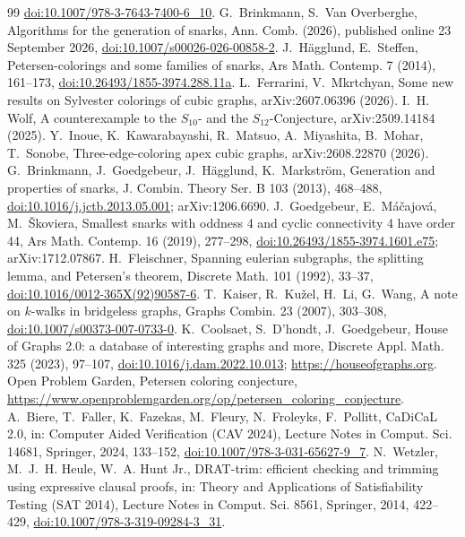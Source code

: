 {\begin{thebibliography}{99}
\href{https://doi.org/10.1007/978-3-7643-7400-6_10}{doi:10.1007/978-3-7643-7400-6\_10}.
 G.~Brinkmann, S.~Van Overberghe, Algorithms for the generation of snarks, Ann. Comb. (2026),
published online 23 September 2026, \href{https://doi.org/10.1007/s00026-026-00858-2}{doi:10.1007/s00026-026-00858-2}.
 J.~H\"agglund, E.~Steffen, Petersen-colorings and some families of snarks,
Ars Math. Contemp. 7 (2014), 161--173,
\href{https://doi.org/10.26493/1855-3974.288.11a}{doi:10.26493/1855-3974.288.11a}.
 L.~Ferrarini, V.~Mkrtchyan, Some new results on Sylvester colorings of cubic graphs,
arXiv:2607.06396 (2026).
 I.~H. Wolf, A counterexample to the $S_{10}$- and the $S_{12}$-Conjecture,
arXiv:2509.14184 (2025).
 Y.~Inoue, K.~Kawarabayashi, R.~Matsuo, A.~Miyashita, B.~Mohar, T.~Sonobe, Three-edge-coloring apex
cubic graphs, arXiv:2608.22870 (2026).
 G.~Brinkmann, J.~Goedgebeur, J.~H\"agglund, K.~Markstr\"om, Generation and
properties of snarks, J. Combin. Theory Ser. B 103 (2013), 468--488,
\href{https://doi.org/10.1016/j.jctb.2013.05.001}{doi:10.1016/j.jctb.2013.05.001}; arXiv:1206.6690.
 J.~Goedgebeur, E.~M\'a\v{c}ajov\'a, M.~\v{S}koviera, Smallest snarks with oddness 4 and
cyclic connectivity 4 have order 44, Ars Math. Contemp. 16 (2019), 277--298,
\href{https://doi.org/10.26493/1855-3974.1601.e75}{doi:10.26493/1855-3974.1601.e75}; arXiv:1712.07867.
 H.~Fleischner, Spanning eulerian subgraphs, the splitting lemma, and
Petersen's theorem, Discrete Math. 101 (1992), 33--37,
\href{https://doi.org/10.1016/0012-365X(92)90587-6}{doi:10.1016/0012-365X(92)90587-6}.
 T.~Kaiser, R.~Ku\v{z}el, H.~Li, G.~Wang, A note on $k$-walks in bridgeless
graphs, Graphs Combin. 23 (2007), 303--308,
\href{https://doi.org/10.1007/s00373-007-0733-0}{doi:10.1007/s00373-007-0733-0}.
 K.~Coolsaet, S.~D'hondt, J.~Goedgebeur, House of Graphs 2.0: a database of
interesting graphs and more, Discrete Appl. Math. 325 (2023), 97--107,
\href{https://doi.org/10.1016/j.dam.2022.10.013}{doi:10.1016/j.dam.2022.10.013};
\url{https://houseofgraphs.org}.
 Open Problem Garden, Petersen coloring conjecture,
\url{https://www.openproblemgarden.org/op/petersen_coloring_conjecture}.
 A.~Biere, T.~Faller, K.~Fazekas, M.~Fleury, N.~Froleyks, F.~Pollitt, CaDiCaL 2.0,
in: Computer Aided Verification (CAV 2024), Lecture Notes in Comput. Sci. 14681, Springer, 2024,
133--152, \href{https://doi.org/10.1007/978-3-031-65627-9_7}{doi:10.1007/978-3-031-65627-9\_7}.
 N.~Wetzler, M.~J.~H. Heule, W.~A. Hunt Jr., DRAT-trim: efficient checking and
trimming using expressive clausal proofs, in: Theory and Applications of Satisfiability Testing
(SAT 2014), Lecture Notes in Comput. Sci. 8561, Springer, 2014, 422--429,
\href{https://doi.org/10.1007/978-3-319-09284-3_31}{doi:10.1007/978-3-319-09284-3\_31}.
\end{thebibliography}
}
